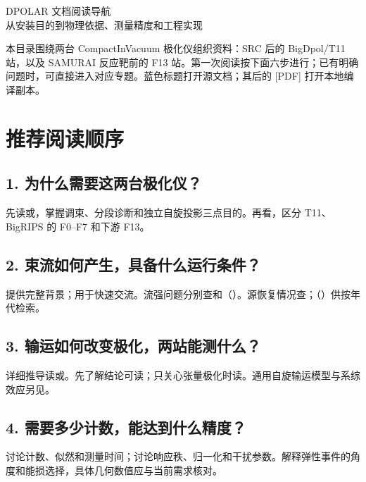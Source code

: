 \documentclass[UTF8,11pt,a4paper,fontset=none]{ctexart}
\begin{document}
\begin{center}
{\LARGE\sffamily\color{ink}DPOLAR 文档阅读导航}\\[6pt]
从安装目的到物理依据、测量精度和工程实现
\end{center}

本目录围绕两台 CompactInVacuum 极化仪组织资料：SRC 后的 BigDpol/T11 站，以及 SAMURAI 反应靶前的 F13 站。第一次阅读按下面六步进行；已有明确问题时，可直接进入对应专题。蓝色标题打开源文档；其后的 [PDF] 打开本地编译副本。

\section{推荐阅读顺序}
\subsection*{1. 为什么需要这两台极化仪？}
先读或，掌握调束、分段诊断和独立自旋投影三点目的。再看，区分 T11、BigRIPS 的 F0--F7 和下游 F13。

\subsection*{2. 束流如何产生，具备什么运行条件？}
提供完整背景；用于快速交流。流强问题分别查和（）。源恢复情况查；（）供按年代检索。

\subsection*{3. 输运如何改变极化，两站能测什么？}
详细推导读或。先了解结论可读；只关心张量极化时读。通用自旋输运模型与系综效应另见。

\subsection*{4. 需要多少计数，能达到什么精度？}
讨论计数、似然和测量时间；讨论响应秩、归一化和干扰参数。解释弹性事件的角度和能损选择，具体几何数值应与当前需求核对。
\end{document}
